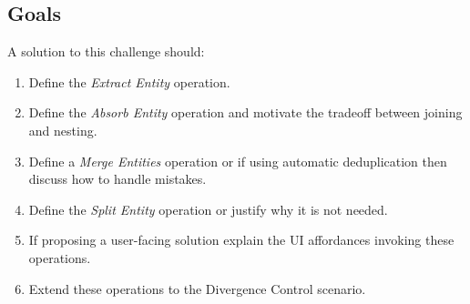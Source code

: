 \documentclass[english,submission]{programming}
\begin{document}
\subsection{Goals}
A solution to this challenge should:
\begin{enumerate}
  \item Define the \textit{Extract Entity} operation.
  \item Define the \textit{Absorb Entity} operation and motivate the tradeoff between joining and nesting.
  \item Define a \textit{Merge Entities} operation or if using automatic deduplication then discuss how to handle mistakes.
  \item Define the \textit{Split Entity} operation or justify why it is not needed.
  \item If proposing a user-facing solution explain the UI affordances invoking these operations.
  \item Extend these operations to the Divergence Control scenario.
\end{enumerate}





\newpage
\end{document}
